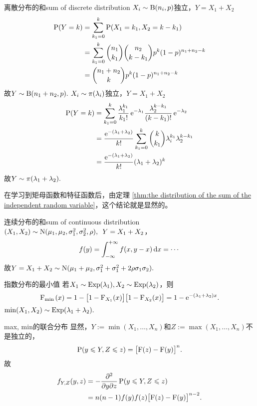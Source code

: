 \begin{example}{离散分布的和}{sum of discrete distribution}
	$X_i\sim\Bern(n_i,p)$独立，$Y=X_1+X_2$
	\begin{align*}
		\P(Y=k)&=\sum_{k_1=0}^k\P(X_1=k_1,X_2=k-k_1)\\
		&=\sum_{k_1=0}^k\binom{n_1}{k_1}\binom{n_2}{k-k_1}p^k(1-p)^{n_1+n_2-k}\\
		&=\binom{n_1+n_2}{k}p^k(1-p)^{n_1+n_2-k}
	\end{align*}
	故$Y\sim\Bern(n_1+n_2,p).$
	\tcblower
	$X_i\sim\Pois(\lambda_i)$独立，$Y=X_1+X_2$
	\begin{align*}
		\P(Y=k)&=\sum_{k_1=0}^k\frac{\lambda_1^{k_1}}{k_1!}\e{-\lambda_1}\frac{\lambda_2^{k-k_1}}{(k-k_1)!}\e{-\lambda_2}\\
		&=\frac{\e{-(\lambda_1+\lambda_2)}}{k!}\sum_{k_1=0}^k\binom{k}{k_1}\lambda_i^{k_1}\lambda_2^{k-k_1}\\
		&=\frac{\e{-(\lambda_1+\lambda_2)}}{k!}(\lambda_1+\lambda_2)^k
	\end{align*}
	故$Y\sim\Pois(\lambda_1+\lambda_2).$
\end{example}
在学习到矩母函数和特征函数后，由定理 \ref{thm:the distribution of the sum of the independent random variable}，这个结论就是显然的。
\begin{example}{连续分布的和}{sum of continuous distribution}
	$(X_1,X_2)\sim\Norm(\mu_1,\mu_2,\sigma_1^2,\sigma_2^2,\rho),\enspace Y=X_1+X_2$，
	\[
		f(y)=\int\iti f(x, y-x)\d x=\cdots
	\]
	故$Y=X_1+X_2\sim\Norm(\mu_1+\mu_2,\sigma_1^2+\sigma_1^2+2\rho\sigma_1\sigma_2).$
\end{example}
\begin{example}{指数分布的最小值}{}
	若$X_1\sim\Expo(\lambda_1),X_2\sim\Expo(\lambda_2)$，则 
	\[
		\CDF_{\min{}}(x)=1-\bigfkh{1-\CDF_{X_1}(x)}\bigfkh{1-\CDF_{X_2}(x)}=1-\e{-(\lambda_1+\lambda_2)x}.
	\]
	$\min(X_1,X_2)\sim\Expo(\lambda_1+\lambda_2).$
\end{example}
\begin{example}{max, min的联合分布}{}
	显然，$Y:=\min(X_1,\ldots,X_n)$和$Z:=\max(X_1,\ldots,X_n)$不是独立的，
	\[
		\P(y\leqslant Y,Z\leqslant z)=\bigfkh{\CDF(z)-\CDF(y)}^n.
	\]
	故
	\begin{align*}
		f_{Y,Z}(y,z)&=-\pw{}yz\P(y\leqslant Y,Z\leqslant z)\\
		&=n(n-1)f(y)f(z)\bigfkh{\CDF(z)-\CDF(y)}^{n-2}.
	\end{align*}
\end{example}
